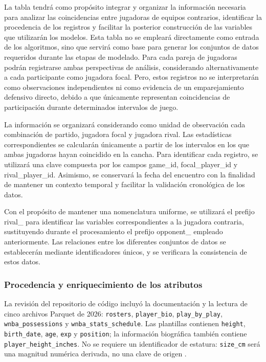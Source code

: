 La tabla tendrá como propósito integrar y organizar la información necesaria para analizar las coincidencias entre jugadoras de equipos contrarios, identificar la procedencia de los registros y facilitar la posterior construcción de las variables que utilizarán los modelos. Esta tabla no se empleará directamente como entrada de los algoritmos, sino que servirá como base para generar los conjuntos de datos requeridos durante las etapas de modelado.
Para cada pareja de jugadoras podrán registrarse ambas perspectivas de análisis, considerando alternativamente a cada participante como jugadora focal. Pero, estos registros no se interpretarán como observaciones independientes ni como evidencia de un emparejamiento defensivo directo, debido a que únicamente representan coincidencias de participación durante determinados intervalos de juego.

La información se organizará considerando como unidad de observación cada combinación de partido, jugadora focal y jugadora rival. Las estadísticas correspondientes se calcularán únicamente a partir de los intervalos en los que ambas jugadoras hayan coincidido en la cancha. Para identificar cada registro, se utilizará una clave compuesta por los campos game\_id, focal\_player\_id y rival\_player\_id. Asimismo, se conservará la fecha del encuentro con la finalidad de mantener un contexto temporal y facilitar la validación cronológica de los datos.

Con el propósito de mantener una nomenclatura uniforme, se utilizará el prefijo rival\_ para identificar las variables correspondientes a la jugadora contraria, sustituyendo durante el procesamiento el prefijo opponent\_ empleado anteriormente. Las relaciones entre los diferentes conjuntos de datos se establecerán mediante identificadores únicos, y se verificara la consistencia de estos datos.
\subsubsection*{Procedencia y enriquecimiento de los atributos}
La revisión del repositorio de código incluyó la documentación y la lectura de cinco archivos Parquet de 2026: \texttt{rosters}, \texttt{player\_bio}, \texttt{play\_by\_play}, \texttt{wnba\_possessions} y \texttt{wnba\_stats\_schedule}. Las plantillas contienen \texttt{height}, \texttt{birth\_date}, \texttt{age}, \texttt{exp} y \texttt{position}; la información biográfica también contiene \texttt{player\_height\_inches}. No se requiere un identificador de estatura: \texttt{size\_cm} será una magnitud numérica derivada, no una clave de origen \cite{repositorioDatosTT,datosTTRosters}.


